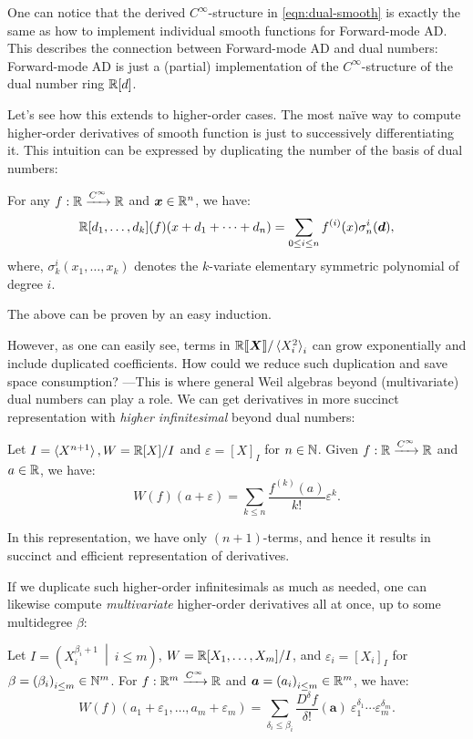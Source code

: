\documentclass[runningheads]{llncs}
\begin{document}
One can notice that the derived $C^\infty$-structure in \eqref{eqn:dual-smooth} is exactly the same as how to implement individual smooth functions for Forward-mode AD.
This describes the connection between Forward-mode AD and dual numbers: Forward-mode AD is just a (partial) implementation of the $C^\infty$-structure of the dual number ring $\mathbb{R}[d]$.

Let's see how this extends to higher-order cases.
The most naïve way to compute higher-order derivatives of smooth function is just to successively differentiating it.
This intuition can be expressed by duplicating the number of the basis of dual numbers:
\begin{theorem}\label{thm:univ-partial-duals}
  For any $f: \mathbb{R} \xrightarrow{C^\infty} \mathbb{R}$ and $\boldsymbol{x} \in \mathbb{R}^n$, we have:
  \[
    \R[d_1, \dots, d_k](f)(x + d_1 + \cdots + d_n) 
    = \sum_{0 \leq i \leq n} f^{(i)}(x)\sigma^i_n(\vec{d}),
  \]
  where, $\sigma^i_k(x_1, \dots, x_k)$ denotes the $k$-variate elementary symmetric polynomial of degree $i$.
\end{theorem}

The above can be proven by an easy induction.

However, as one can easily see, terms in $\mathord{\mathbb{R}\llbracket\boldsymbol{X}\rrbracket}/\braket{X_i^2}_i$ can grow exponentially and include duplicated coefficients.
How could we reduce such duplication and save space consumption? ---This is where general Weil algebras beyond (multivariate) dual numbers can play a role.
We can get derivatives in more succinct representation with \emph{higher infinitesimal} beyond dual numbers:

\begin{lemma}\label{lem:higher-infinitesimal}
  Let $I = \braket{X^{n + 1}}, W = \mathbb{R}[X]/I$ and $\varepsilon = {[X]}_I$ for $n \in \mathbb{N}$.
  Given $f: \mathbb{R} \xrightarrow{C^\infty} \mathbb{R}$ and $a \in \mathbb{R}$, we have:
  \[
    W(f)(a + \varepsilon)
    = \sum_{k \leq n} \frac{f^{(k)}(a)}{k !} \varepsilon^k.
  \]
\end{lemma}
In this representation, we have only $(n + 1)$-terms, and hence it results in succinct and efficient representation of derivatives.

If we duplicate such higher-order infinitesimals as much as needed, one can likewise compute \emph{multivariate} higher-order derivatives all at once, up to some multidegree $\beta$:
\begin{lemma}
  Let $I = \left(X_i^{\beta_i + 1}\ \middle|\ i \leq m \right)$, $W = \mathbb{R}[X_1, \dots, X_m]/I$, and $\varepsilon_i = {[X_i]}_I$ for $\beta = {(\beta_i)}_{i \leq m} \in \mathbb{N}^m$.
  For $f: \mathbb{R}^m \xrightarrow{C^\infty} \mathbb{R}$ and $\boldsymbol{a} = {(a_i)}_{i \leq m} \in \mathbb{R}^m$, we have:
  \[
    W(f)(a_1 + \varepsilon_1, \dots, a_m + \varepsilon_m) =
      \sum_{\delta_i \leq \beta_i} 
      \frac{D^\delta f}{\delta !}(\boldsymbol{a})\ \varepsilon_1^{\delta_1} \cdots \varepsilon_m^{\delta_m}.
  \]
\end{lemma}
\end{document}
